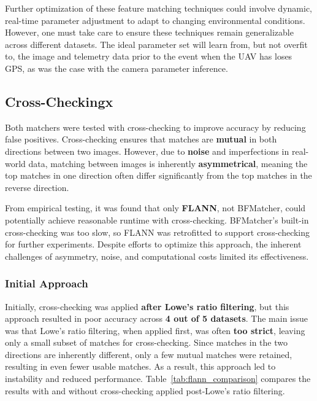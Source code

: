 Further optimization of these feature matching techniques could involve dynamic, real-time parameter adjustment to adapt to changing environmental conditions. However, one must take care to ensure these techniques remain generalizable across different datasets. The ideal parameter set will learn from, but not overfit to, the image and telemetry data prior to the event when the UAV has loses GPS, as was the case with the camera parameter inference. 





\subsection*{Cross-Checkingx}  

Both matchers were tested with cross-checking to improve accuracy by reducing false positives. Cross-checking ensures that matches are \textbf{mutual} in both directions between two images. However, due to \textbf{noise} and imperfections in real-world data, matching between images is inherently \textbf{asymmetrical}, meaning the top matches in one direction often differ significantly from the top matches in the reverse direction. 

From empirical testing, it was found that only \textbf{FLANN}, not BFMatcher, could potentially achieve reasonable runtime with cross-checking. BFMatcher’s built-in cross-checking was too slow, so FLANN was retrofitted to support cross-checking for further experiments. Despite efforts to optimize this approach, the inherent challenges of asymmetry, noise, and computational costs limited its effectiveness. 

\subsubsection{Initial Approach}  
Initially, cross-checking was applied \textbf{after Lowe’s ratio filtering}, but this approach resulted in poor accuracy across \textbf{4 out of 5 datasets}. The main issue was that Lowe’s ratio filtering, when applied first, was often \textbf{too strict}, leaving only a small subset of matches for cross-checking. Since matches in the two directions are inherently different, only a few mutual matches were retained, resulting in even fewer usable matches. As a result, this approach led to instability and reduced performance. Table~\ref{tab:flann_comparison} compares the results with and without cross-checking applied post-Lowe's ratio filtering.

